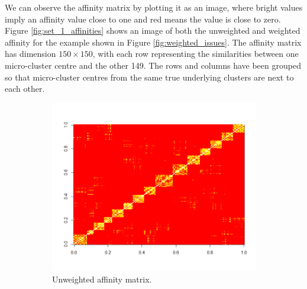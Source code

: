 We can observe the affinity matrix by plotting it as an image, where bright values imply an affinity value close to one and red means the value is close to zero. Figure \ref{fig:set_1_affinities} shows an image of both the unweighted and weighted affinity for the example shown in Figure \ref{fig:weighted_issues}. The affinity matrix has dimension $150 \times 150$, with each row representing the similarities between one micro-cluster centre and the other 149. The rows and columns have been grouped so that micro-cluster centres from the same true underlying clusters are next to each other. 

\begin{figure}[h]
  \centering
  \begin{subfigure}{0.45\textwidth}
    \centering
    \includegraphics[width = \textwidth, height = \textwidth]{s_set/s_set_1_unweighted_affinity.png}
    \caption{Unweighted affinity matrix.}
  \label{fig:unweighted_affinity}
  \end{subfigure}
  \begin{subfigure}{0.45\textwidth}
    \centering

\end{subfigure}
\end{figure}
